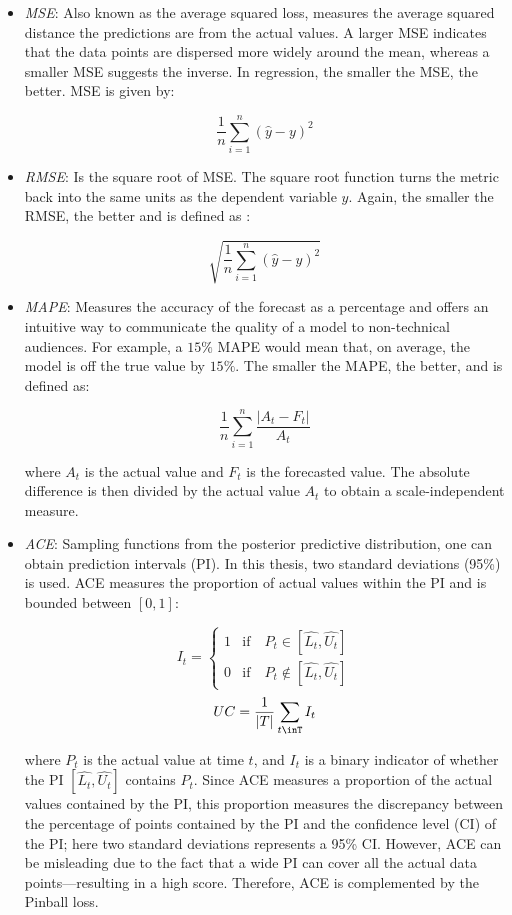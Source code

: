 \begin{itemize}
    \item \textit{MSE}: Also known as the average squared loss, measures the average squared distance the predictions are from the actual values. A larger MSE indicates that the data points are dispersed more widely around the mean, whereas a smaller MSE suggests the inverse. In regression, the smaller the MSE, the better. MSE is given by:
    
    $$\frac{1}{n}\sum_{i=1}^n(\hat{y} - y)^2$$
    
    \item \textit{RMSE}: Is the square root of MSE. The square root function turns the metric back into the same units as the dependent variable $y$. Again, the smaller the RMSE, the better and is defined as :
    
    $$\sqrt{\frac{1}{n}\sum_{i=1}^n(\hat{y} - y)^2}$$
    
    \item \textit{MAPE}: Measures the accuracy of the forecast as a percentage and offers an intuitive way to communicate the quality of a model to non-technical audiences. For example,  a $15\%$ MAPE would mean that, on average, the model is off the true value by $15\%$. The smaller the MAPE, the better, and is defined as:
    
    $$\frac{1}{n}\sum_{i=1}^n \frac{|A_t - F_t|}{A_t}$$
    
    where $A_t$ is the actual value and $F_t$ is the forecasted value. The absolute difference is then divided by the actual value $A_t$ to obtain a scale-independent measure. 
    
    \item \textit{ACE}: Sampling functions from the posterior predictive distribution, one can obtain prediction intervals (PI). In this thesis, two standard deviations (95\%) is used. ACE measures the proportion of actual values within the PI and is bounded between $[0, 1]$:
    
    $$ I_t = 
    \begin{cases}
      1 & \text{if} \quad P_t \in [\hat{L_t}, \hat{U_t}] \\
      0 & \text{if} \quad P_t \notin [\hat{L_t}, \hat{U_t}]
    \end{cases}
    $$
    $$UC = \frac{1}{|T|}\sum_{t\inT}I_t$$
    
    where $P_t$ is the actual value at time $t$, and $I_t$ is a binary indicator of whether the PI $ [\hat{L_t}, \hat{U_t}]$ contains $P_t$. Since ACE measures a proportion of the actual values contained by the PI, this proportion measures the discrepancy between the percentage of points contained by the PI and the confidence level (CI) of the PI; here two standard deviations represents a 95\% CI. However, ACE can be misleading due to the fact that a wide PI can cover all the actual data points—resulting in a high score. Therefore, ACE is complemented by the Pinball loss.
    

\end{itemize}
